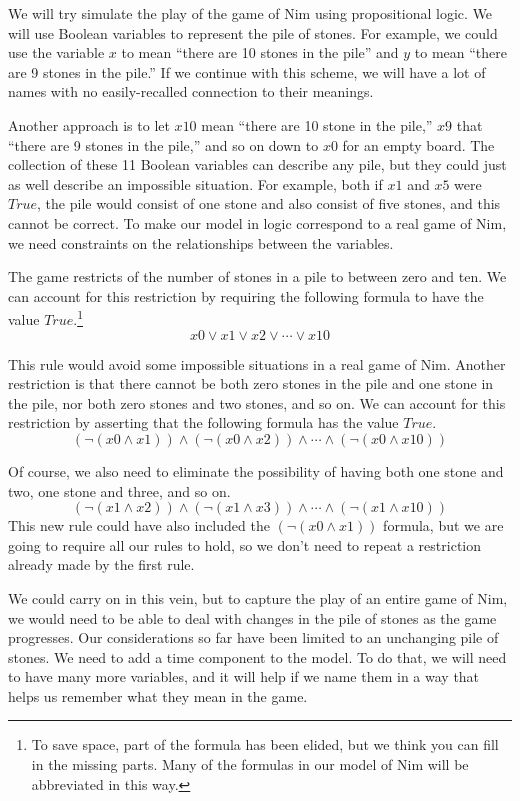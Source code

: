 {{We will try simulate the play of the game of Nim using propositional logic.
We will use Boolean variables to represent the pile of stones.
For example, we could use the variable $x$ to mean ``there are 10 stones in the pile''
and $y$ to mean ``there are 9 stones in the pile.''
If we continue with this scheme, we will have a lot of names with
no easily-recalled connection to their meanings.

Another approach is to let $x10$ mean ``there are 10 stone in the pile,''
$x9$ that ``there are 9 stones in the pile,'' and so on
down to $x0$ for an empty board.
The collection of these 11 Boolean variables can describe any pile,
but they could just as well describe an impossible situation.
For example, both if $x1$ and $x5$ were $True$,
the pile would consist of one stone and also consist of five stones,
and this cannot be correct.
To make our model in logic correspond to a real game of Nim,
we need constraints on the relationships between the variables.

The game restricts of the number
of stones in a pile to between zero and ten.
We can account for this restriction by requiring
the following formula to have the value $True$.\footnote{To
save space, part of the formula has
been elided, but we think you can fill in the missing parts.
Many of the formulas in our model of Nim will be abbreviated in this way.}
$$x0 \vee x1 \vee x2 \vee \cdots \vee x10$$

This rule would avoid some impossible situations in a real game of Nim.
Another restriction is that there cannot be both zero stones in the pile
and one stone in the pile, nor both zero stones and two stones, and so on.
We can account for this restriction by asserting that the following formula
has the value $True$.
$$(\neg(x0 \wedge x1)) \wedge (\neg(x0 \wedge x2)) \wedge \cdots \wedge (\neg(x0 \wedge x10))$$

Of course,
we also need to eliminate the possibility of having
both one stone and two, one stone and three, and so on.
$$(\neg(x1 \wedge x2)) \wedge (\neg(x1 \wedge x3)) \wedge \cdots \wedge (\neg(x1 \wedge x10))$$
This new rule could have also included the $(\neg(x0 \wedge x1))$ formula,
but we are going to require all our rules to hold, so we don't need to
repeat a restriction already made by the first rule.

We could carry on in this vein,
but to capture the play of an entire game of Nim,
we would need to be able to deal with changes in the pile of stones
as the game progresses.
Our considerations so far have been limited to an unchanging pile of stones.
We need to add a time component to the model.
To do that, we will need to have many more variables,
and it will help if we name them in a way that helps
us remember what they mean in the game.

}}
